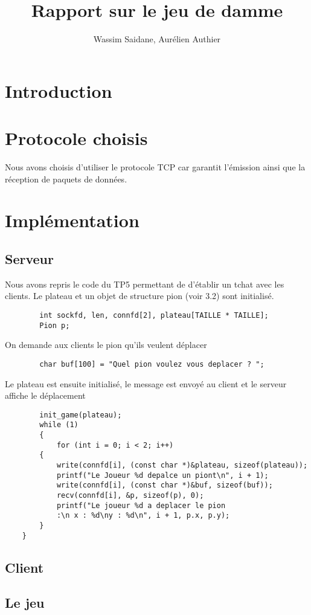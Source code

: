 \documentclass{article}
\title{Rapport sur le jeu de damme}
\author{Wassim Saidane, Aurélien Authier}
\date{}
\begin{document}
    \lstset{language=C}
    \maketitle
    \tableofcontents
    \newpage
    \section{Introduction}

    \section{Protocole choisis}
        Nous avons choisis d'utiliser le protocole TCP car garantit l’émission ainsi que la réception de paquets de données.
    \section{Implémentation}
    \subsection{Serveur}
    Nous avons repris le code du TP5 permettant de d'établir un tchat avec les clients.
    Le plateau et un objet de structure pion (voir 3.2) sont initialisé.
    \begin{lstlisting}
        int sockfd, len, connfd[2], plateau[TAILLE * TAILLE];
        Pion p;
    \end{lstlisting}
    On demande aux clients le pion qu'ils veulent déplacer 
    \begin{lstlisting}
        char buf[100] = "Quel pion voulez vous deplacer ? ";
    \end{lstlisting}
    Le plateau est ensuite initialisé, le message est envoyé au client et le serveur affiche le déplacement
    \begin{lstlisting}
        init_game(plateau);
        while (1)
        {
            for (int i = 0; i < 2; i++)
        {
            write(connfd[i], (const char *)&plateau, sizeof(plateau));
            printf("Le Joueur %d depalce un piont\n", i + 1);
            write(connfd[i], (const char *)&buf, sizeof(buf));
            recv(connfd[i], &p, sizeof(p), 0);
            printf("Le joueur %d a deplacer le pion 
            :\n x : %d\ny : %d\n", i + 1, p.x, p.y);
        }
    }
    \end{lstlisting}

    
    \subsection{Client}
    
    \subsection{Le jeu}
\end{document}
